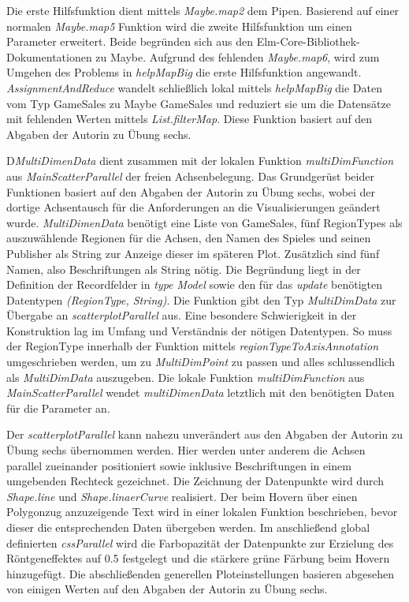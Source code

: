 \documentclass[usegeometry=true]{scrartcl}
\begin{document}
Die erste Hilfsfunktion dient mittels \textit{Maybe.map2} dem Pipen.
Basierend auf einer normalen \textit{Maybe.map5} Funktion wird die zweite Hilfsfunktion um einen Parameter erweitert. 
Beide begründen sich aus den Elm-Core-Bibliothek-Dokumentationen zu Maybe.\cite{EvanCzaplicki.o.J.} 
Aufgrund des fehlenden \textit{Maybe.map6}, wird zum Umgehen des Problems in \textit{helpMapBig} die erste Hilfsfunktion angewandt. 
\textit{AssignmentAndReduce} wandelt schließlich lokal mittels \textit{helpMapBig} die Daten vom Typ GameSales zu Maybe GameSales 
und reduziert sie um die Datensätze mit fehlenden Werten mittels \textit{List.filterMap}.
Diese Funktion basiert auf den Abgaben der Autorin zu Übung sechs.

D\textit{MultiDimenData} dient zusammen mit der lokalen Funktion \textit{multiDimFunction} aus \textit{MainScatterParallel} 
der freien Achsenbelegung.
Das Grundgerüst beider Funktionen basiert auf den Abgaben der Autorin zu Übung sechs, 
wobei der dortige Achsentausch für die Anforderungen an die Visualisierungen geändert wurde. 
\textit{MultiDimenData} benötigt eine Liste von GameSales, fünf RegionTypes als auszuwählende Regionen für die Achsen, 
den Namen des Spieles und seinen Publisher als String zur Anzeige dieser im späteren Plot. 
Zusätzlich sind fünf Namen, also Beschriftungen als String nötig. 
Die Begründung liegt in der Definition der Recordfelder in \textit{type Model} sowie den für das \textit{update} benötigten Datentypen 
\textit{(RegionType, String)}.
Die Funktion gibt den Typ \textit{MultiDimData} zur Übergabe an \textit{scatterplotParallel} aus. 
Eine besondere Schwierigkeit in der Konstruktion lag im Umfang und Verständnis der nötigen Datentypen. 
So muss der RegionType innerhalb der Funktion mittels \textit{regionTypeToAxisAnnotation} umgeschrieben werden, 
um zu \textit{MultiDimPoint} zu passen und alles schlussendlich als \textit{MultiDimData} auszugeben. 
Die lokale Funktion \textit{multiDimFunction} aus \textit{MainScatterParallel} wendet \textit{multiDimenData} 
letztlich mit den benötigten Daten für die Parameter an.

Der \textit{scatterplotParallel} kann nahezu unverändert aus den Abgaben der Autorin zu Übung sechs übernommen werden. 
Hier werden unter anderem die Achsen parallel zueinander positioniert sowie inklusive Beschriftungen in einem umgebenden Rechteck gezeichnet.
Die Zeichnung der Datenpunkte wird durch \textit{Shape.line} und \textit{Shape.linaerCurve} realisiert.
Der beim Hovern über einen Polygonzug anzuzeigende Text wird in einer lokalen Funktion beschrieben, bevor dieser die entsprechenden Daten übergeben werden.
Im anschließend global definierten \textit{cssParallel} wird die Farbopazität der Datenpunkte zur Erzielung des Röntgeneffektes auf 0.5 festgelegt 
und die stärkere grüne Färbung beim Hovern hinzugefügt. 
Die abschließenden generellen Ploteinstellungen basieren abgesehen von einigen Werten auf den Abgaben der Autorin zu Übung sechs. 
 
\end{document}
